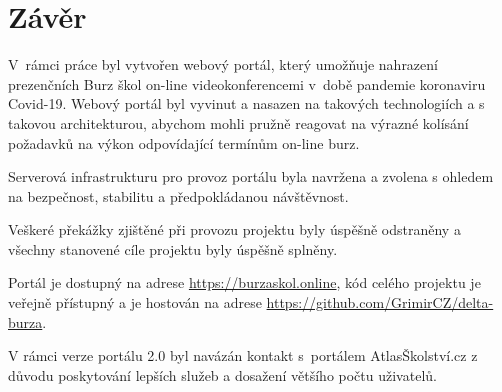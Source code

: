 \chapter*{Závěr}

V~rámci práce byl vytvořen webový portál, který umožňuje nahrazení prezenčních Burz škol on-line 
videokonferencemi v~době pandemie koronaviru Covid-19.
Webový portál byl vyvinut a nasazen na takových technologiích a s takovou architekturou, 
abychom mohli pružně reagovat na výrazné kolísání požadavků na výkon odpovídající termínům on-line burz.

Serverová infrastrukturu pro provoz portálu byla navržena a zvolena s ohledem na bezpečnost, stabilitu 
a předpokládanou návštěvnost. 

Veškeré překážky zjištěné při provozu projektu \bso{} byly úspěšně odstraněny a všechny stanovené cíle 
projektu byly úspěšně splněny.

Portál je dostupný na adrese \href{https://burzaskol.online}{https://burzaskol.online},
kód celého projektu je veřejně přístupný a je hostován na adrese \href{https://github.com/GrimirCZ/delta-burza}{https://github.com/GrimirCZ/delta-burza}.

V rámci verze portálu 2.0 byl navázán kontakt s~portálem AtlasŠkolství.cz z důvodu poskytování lepších 
služeb a dosažení většího počtu uživatelů. 


%
\pagebreak
